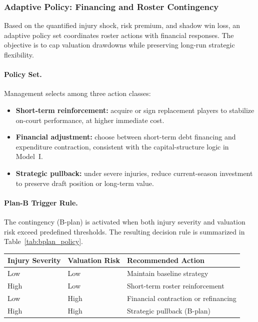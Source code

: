 \documentclass[12pt]{article}
\numberwithin{figure}{section}
\numberwithin{table}{section}
\begin{document}
	\subsubsection{Adaptive Policy: Financing and Roster Contingency}
	
	Based on the quantified injury shock, risk premium, and shadow win loss, an adaptive policy set coordinates roster actions with financial responses. 
	The objective is to cap valuation drawdowns while preserving long-run strategic flexibility.
	
	\paragraph{Policy Set.}
	Management selects among three action classes:
	\begin{itemize}
		\item \textbf{Short-term reinforcement:} acquire or sign replacement players to stabilize on-court performance, at higher immediate cost.
		\item \textbf{Financial adjustment:} choose between short-term debt financing and expenditure contraction, consistent with the capital-structure logic in Model~I.
		\item \textbf{Strategic pullback:} under severe injuries, reduce current-season investment to preserve draft position or long-term value.
	\end{itemize}
	
	\paragraph{Plan-B Trigger Rule.}
	The contingency (B-plan) is activated when both injury severity and valuation risk exceed predefined thresholds. 
	The resulting decision rule is summarized in Table~\ref{tab:bplan_policy}.
	
	\begin{center}
		\small
		\setlength{\tabcolsep}{4pt}
		\renewcommand{\arraystretch}{1.05}
		\begin{tabular}{p{3cm} p{3cm} p{4.5cm}}
			\toprule
			\textbf{Injury Severity} & \textbf{Valuation Risk} & \textbf{Recommended Action} \\
			\midrule
			Low  & Low  & Maintain baseline strategy \\
			High & Low  & Short-term roster reinforcement \\
			Low  & High & Financial contraction or refinancing \\
			High & High & Strategic pullback (B-plan) \\
			\bottomrule
		\end{tabular}
		
		\vspace{2pt}
		\label{tab:bplan_policy}
	\end{center}
	
\end{document}
